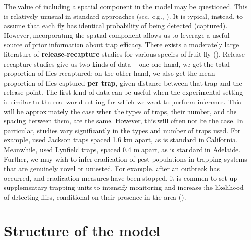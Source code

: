 \documentclass[
  oneside]{book}
\begin{document}
The value of including a spatial component in the model may be questioned. This is relatively unusual in standard approaches (see, e.g., \citet{mcardle1990}). It is typical, instead, to assume that each fly has identical probability of being detected (captured). However, incorporating the spatial component allows us to leverage a useful source of prior information about trap efficacy. There exists a moderately large literature of \textbf{release-recapture} studies for various species of fruit fly (\citet{todocite}). Release recapture studies give us two kinds of data -- one one hand, we get the total proportion of flies recaptured; on the other hand, we also get the mean proportion of flies captured \textbf{per trap}, given distance between that trap and the release point. The first kind of data can be useful when the experimental setting is similar to the real-world setting for which we want to perform inference. This will be approximately the case when the types of traps, their number, and the spacing between them, are the same. However, this will often not be the case. In particular, studies vary significantly in the types and number of traps used. For example, \citet{lance1994} used Jackson traps spaced 1.6 km apart, as is standard in California. Meanwhile, \citet{ms2007} used Lynfield traps, spaced 0.4 m apart, as is standard in Adelaide. Further, we may wish to infer eradication of pest populations in trapping systems that are genuinely novel or untested. For example, after an outbreak has occurred, and eradication measures have been stopped, it is common to set up supplementary trapping units to intensify monitoring and increase the likelihood of detecting flies, conditional on their presence in the area (\citet{supptraps}).

\hypertarget{structure-of-the-model}{%
\section{Structure of the model}\label{structure-of-the-model}}
\end{document}
